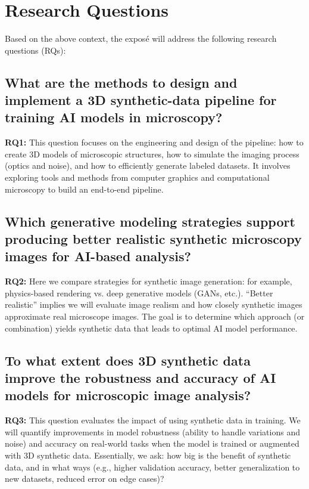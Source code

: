 \documentclass[
oneside,      %
openany       %
]{imc-inf}
\begin{document}
	
	
	
	\chapter{Research Questions}\label{chap:research-questions}
	
	Based on the above context, the exposé will address the following research questions (RQs):
	
	\section{What are the methods to design and implement a 3D synthetic-data pipeline for training AI models in microscopy?}
	
	\textbf{RQ1:} This question focuses on the engineering and design of the pipeline: how to create 3D models of microscopic structures, how to simulate the imaging process (optics and noise), and how to efficiently generate labeled datasets. It involves exploring tools and methods from computer graphics and computational microscopy to build an end-to-end pipeline.
	
	\section{Which generative modeling strategies support producing better realistic synthetic microscopy images for AI-based analysis?}
	
	\textbf{RQ2:} Here we compare strategies for synthetic image generation: for example, physics-based rendering vs. deep generative models (GANs, etc.). “Better realistic” implies we will evaluate image realism and how closely synthetic images approximate real microscope images. The goal is to determine which approach (or combination) yields synthetic data that leads to optimal AI model performance.
	
	\section{To what extent does 3D synthetic data improve the robustness and accuracy of AI models for microscopic image analysis?}
	
	\textbf{RQ3:} This question evaluates the impact of using synthetic data in training. We will quantify improvements in model robustness (ability to handle variations and noise) and accuracy on real-world tasks when the model is trained or augmented with 3D synthetic data. Essentially, we ask: how big is the benefit of synthetic data, and in what ways (e.g., higher validation accuracy, better generalization to new datasets, reduced error on edge cases)?
	
\end{document}
